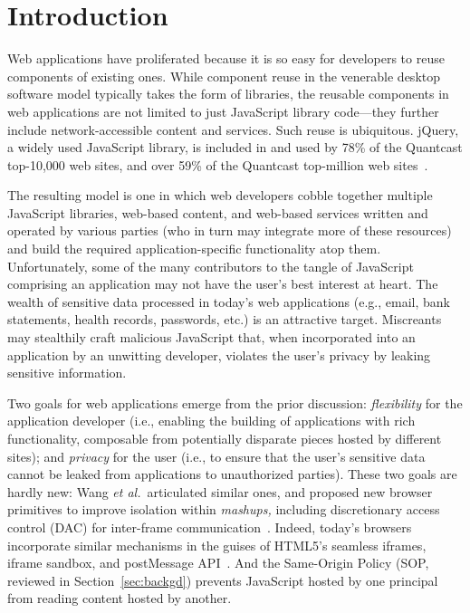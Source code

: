 \section{Introduction}
\label{sec:intro}

Web applications have proliferated because it is so easy for
developers to reuse components of existing ones.  While component
reuse in the venerable desktop software model typically takes the form
of libraries, the reusable components in web applications are not
limited to just JavaScript library code---they further include
network-accessible content and services. Such reuse is
ubiquitous. jQuery, a widely used JavaScript library, is included in
and used by 78\% of the Quantcast top-10,000 web sites, and over 59\%
of the Quantcast top-million web sites~\cite{quantcast}.

The resulting model is one in which web developers cobble together
multiple JavaScript libraries, web-based content, and web-based
services written and operated by various parties (who in turn may
integrate more of these resources) and build the required
application-specific functionality atop them. Unfortunately, some of
the many contributors to the tangle of JavaScript comprising an
application may not have the user's best interest at heart. The wealth
of sensitive data processed in today's web applications (e.g., email,
bank statements, health records, passwords, etc.) is an attractive
target. Miscreants may stealthily craft malicious JavaScript that,
when incorporated into an application by an unwitting developer,
violates the user's privacy by leaking sensitive information.

Two goals for web applications emerge from the prior discussion:
{\em flexibility} for the application developer (i.e., enabling the
building of applications with rich functionality, composable from
potentially disparate pieces hosted by different sites); and {\em
  privacy} for the user (i.e., to ensure that the user's sensitive
data cannot be leaked from applications to unauthorized parties).
These two goals are hardly new: Wang {\em et al.}~articulated similar
ones, and proposed new browser primitives to improve isolation within
{\em mashups,} including discretionary access control (DAC) for inter-frame
communication~\cite{mashupos}. Indeed, today's browsers incorporate
similar mechanisms in the guises of HTML5's seamless iframes, iframe
sandbox, and postMessage API~\cite{html5}. And the Same-Origin Policy
(SOP, reviewed in Section~\ref{sec:backgd}) prevents JavaScript hosted
by one principal from reading content hosted by another.

